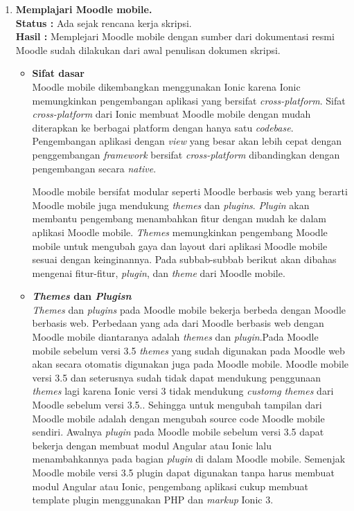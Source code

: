 \documentclass[a4paper,twoside]{article}
\begin{document}
	\begin{enumerate}
		\item \textbf{Memplajari Moodle mobile.}\\
		{\bf Status :} Ada sejak rencana kerja skripsi.\\
		{\bf Hasil :} Memplejari Moodle mobile dengan sumber dari dokumentasi resmi Moodle sudah dilakukan dari awal penulisan dokumen skripsi. 
\begin{itemize}
\item \textbf{Sifat dasar} \\
Moodle mobile dikembangkan menggunakan Ionic karena Ionic memungkinkan pengembangan aplikasi yang bersifat \textit{cross-platform}. Sifat \textit{cross-platform} dari Ionic membuat Moodle mobile dengan mudah diterapkan ke berbagai platform dengan hanya satu \textit{codebase}. Pengembangan aplikasi dengan \textit{view} yang besar akan lebih cepat dengan penggembangan \textit{framework} bersifat \textit{cross-platform} dibandingkan dengan pengembangan secara \textit{native}. 

Moodle mobile bersifat modular seperti Moodle berbasis web yang berarti Moodle mobile juga mendukung \textit{themes} dan \textit{plugins}. \textit{Plugin} akan membantu pengembang menambahkan fitur dengan mudah ke dalam aplikasi Moodle mobile. \textit{Themes} memungkinkan pengembang Moodle mobile untuk mengubah gaya dan layout dari aplikasi Moodle mobile sesuai dengan keinginannya. Pada subbab-subbab berikut akan dibahas mengenai fitur-fitur, \textit{plugin}, dan \textit{theme} dari Moodle mobile.

\item \textbf{\textit{Themes} dan \textit{Plugisn}} \\
\textit{Themes} dan \textit{plugins} pada Moodle mobile bekerja berbeda dengan Moodle berbasis web. Perbedaan yang ada dari Moodle berbasis web dengan Moodle mobile diantaranya adalah \textit{themes} dan \textit{plugin}.Pada Moodle mobile sebelum versi 3.5 \textit{themes} yang sudah digunakan pada Moodle web akan secara otomatis digunakan juga pada Moodle mobile. Moodle mobile versi 3.5 dan seterusnya sudah tidak dapat mendukung penggunaan \textit{themes} lagi karena Ionic versi 3 tidak mendukung \textit{customg themes} dari Moodle sebelum versi 3.5.. Sehingga untuk mengubah tampilan dari Moodle mobile adalah dengan mengubah source code Moodle mobile sendiri. Awalnya \textit{plugin} pada Moodle mobile sebelum versi 3.5 dapat bekerja dengan membuat modul Angular atau Ionic lalu menambahkannya pada bagian \textit{plugin} di dalam Moodle mobile. Semenjak Moodle mobile versi 3.5 plugin dapat digunakan tanpa harus membuat modul Angular atau Ionic, pengembang aplikasi cukup membuat template plugin menggunakan PHP dan \textit{markup} Ionic 3.


\end{itemize}
\end{enumerate}
\end{document}
